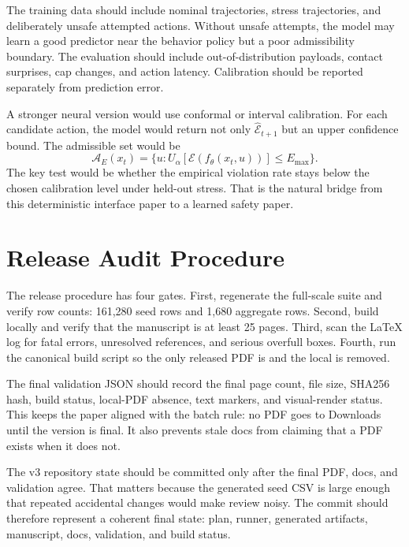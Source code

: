 \documentclass{article}
\newcommand{\state}{x}
\newcommand{\action}{u}
\newcommand{\storage}{\mathcal{E}}
\newcommand{\admiss}{\mathcal{A}}
\newcommand{\seedrows}{161,280}
\newcommand{\aggrows}{1,680}
\begin{document}
The training data should include nominal trajectories, stress trajectories, and deliberately unsafe attempted actions. Without unsafe attempts, the model may learn a good predictor near the behavior policy but a poor admissibility boundary. The evaluation should include out-of-distribution payloads, contact surprises, cap changes, and action latency. Calibration should be reported separately from prediction error.

A stronger neural version would use conformal or interval calibration. For each candidate action, the model would return not only $\hat{\storage}_{t+1}$ but an upper confidence bound. The admissible set would be
\begin{equation}
    \admiss_E(\state_t)=
    \{\action:
    U_\alpha[\storage(f_\theta(\state_t,\action))]
    \leq
    E_{\max}\}.
\end{equation}
The key test would be whether the empirical violation rate stays below the chosen calibration level under held-out stress. That is the natural bridge from this deterministic interface paper to a learned safety paper.

\section{Release Audit Procedure}

The release procedure has four gates. First, regenerate the full-scale suite and verify row counts: \seedrows{} seed rows and \aggrows{} aggregate rows. Second, build locally and verify that the manuscript is at least 25 pages. Third, scan the LaTeX log for fatal errors, unresolved references, and serious overfull boxes. Fourth, run the canonical build script so the only released PDF is  and the local  is removed.

The final validation JSON should record the final page count, file size, SHA256 hash, build status, local-PDF absence, text markers, and visual-render status. This keeps the paper aligned with the batch rule: no PDF goes to Downloads until the version is final. It also prevents stale docs from claiming that a PDF exists when it does not.

The v3 repository state should be committed only after the final PDF, docs, and validation agree. That matters because the generated seed CSV is large enough that repeated accidental changes would make review noisy. The commit should therefore represent a coherent final state: plan, runner, generated artifacts, manuscript, docs, validation, and build status.
\end{document}
